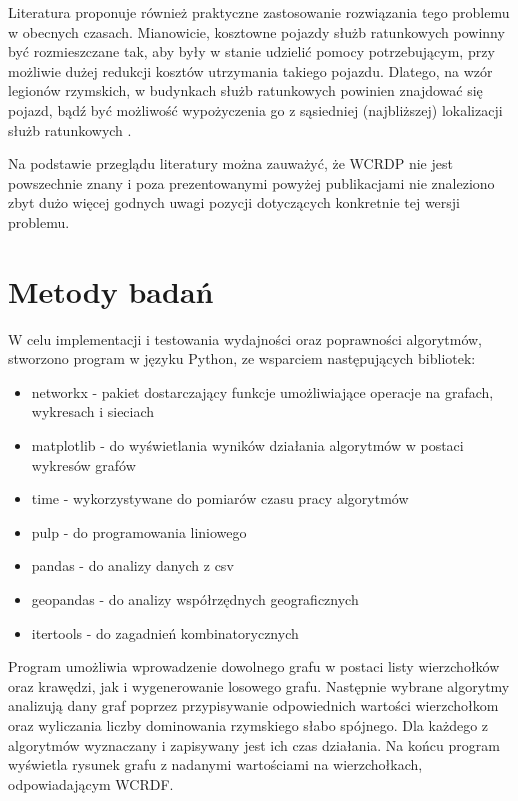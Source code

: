 Literatura proponuje również praktyczne zastosowanie rozwiązania tego problemu w obecnych czasach. Mianowicie, kosztowne pojazdy służb ratunkowych powinny być rozmieszczane tak, aby były w stanie udzielić pomocy potrzebującym, przy możliwie dużej redukcji kosztów utrzymania takiego pojazdu. Dlatego, na wzór legionów rzymskich, w budynkach służb ratunkowych powinien znajdować się pojazd, bądź być możliwość wypożyczenia go z sąsiedniej (najbliższej) lokalizacji służb ratunkowych \cite{improvedILP}.

Na podstawie przeglądu literatury można zauważyć, że WCRDP nie jest powszechnie znany i poza prezentowanymi powyżej publikacjami nie znaleziono zbyt dużo więcej godnych uwagi pozycji dotyczących konkretnie tej wersji problemu. 

\section{Metody badań}
W celu implementacji i testowania wydajności oraz poprawności algorytmów, stworzono program w języku Python, ze wsparciem następujących bibliotek:
\begin{itemize}
    \item networkx - pakiet dostarczający funkcje umożliwiające operacje na grafach, wykresach i sieciach
    \item matplotlib - do wyświetlania wyników działania algorytmów w postaci wykresów grafów
    \item time - wykorzystywane do pomiarów czasu pracy algorytmów
    \item pulp - do programowania liniowego
    \item pandas - do analizy danych z csv
    \item geopandas - do analizy współrzędnych geograficznych
    \item itertools - do zagadnień kombinatorycznych
\end{itemize}

Program umożliwia wprowadzenie dowolnego grafu w postaci listy wierzchołków oraz krawędzi, jak i wygenerowanie losowego grafu. Następnie wybrane algorytmy analizują dany graf poprzez przypisywanie odpowiednich wartości wierzchołkom oraz wyliczania liczby dominowania rzymskiego słabo spójnego. Dla każdego z algorytmów wyznaczany i zapisywany jest ich czas działania. Na końcu program wyświetla rysunek grafu z nadanymi wartościami na wierzchołkach, odpowiadającym WCRDF.\\

